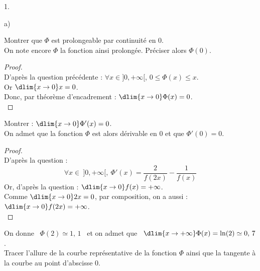 \documentclass[11pt]{article}%
\begin{document}
\begin{noliste}{1.}
  \item 
  \begin{noliste}{a)}
    \setlength{\itemsep}{2mm}
    \item Montrer que $\Phi$ est prolongeable par continuité en $0$.\\
    On note encore $\Phi$ la fonction ainsi prolongée. Préciser alors 
    $\Phi(0)$.
    
    \begin{proof}~\\
      D'après la question précédente : $\forall x \in ]0,+\infty[$, 
      $0 \leq \Phi(x) \leq x$.\\
      Or $\dlim{x\to 0} x = 0$.\\
      Donc, par théorème d'encadrement : $\dlim{x\to 0} \Phi(x) =0$.
      ~\\[-1cm]
    \end{proof}

    
  \item Montrer : $\dlim{x\to 0} \Phi'(x) =0$.\\
    On admet que la fonction $\Phi$ est alors dérivable en $0$ et que
    $\Phi'(0)=0$.
    
    \begin{proof}~\\
      D'après la question  :
      \[
        \forall x \in \ ]0,+\infty[, \ \Phi'(x) = \dfrac{2}{f(2x)}
        - \dfrac{1}{f(x)}
      \]
      Or, d'après la question  : $\dlim{x\to 0} f(x) =
      +\infty$.\\
      Comme $\dlim{x\to 0} 2x =0$, par composition, on a aussi : 
      $\dlim{x\to 0} f(2x) = +\infty$.
      ~\\[-1cm]
    \end{proof}
  \end{noliste}
  
  
  \newpage
  
  
  \item On donne \ $\Phi(2) \simeq 1, \, 1$ \ et on admet que \ 
  $\dlim{x\to +\infty} \Phi(x) = \ln(2) \simeq 0, \, 7$.\\
  Tracer l'allure de la courbe représentative de la fonction $\Phi$ 
  ainsi que la tangente à la courbe au point d'abscisse $0$.
  

\end{noliste}
\end{document}
